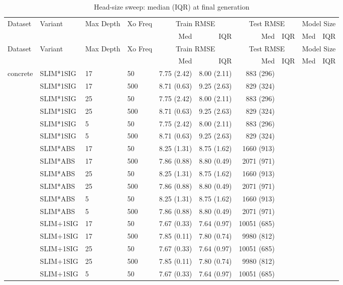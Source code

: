 \begin{longtable}{llllrrrrrr}
\caption{Head-size sweep: median (IQR) at final generation} \label{tab:head_size} \\
\toprule
Dataset & Variant & Max Depth & Xo Freq & \multicolumn{2}{c}{Train RMSE} & \multicolumn{2}{c}{Test RMSE} & \multicolumn{2}{c}{Model Size} \\
\cmidrule(lr){5-6}\cmidrule(lr){7-8}\cmidrule(lr){9-10}
 & &  &  & Med & IQR & Med & IQR & Med & IQR \\
\midrule
\endfirsthead
\toprule
Dataset & Variant & Max Depth & Xo Freq & \multicolumn{2}{c}{Train RMSE} & \multicolumn{2}{c}{Test RMSE} & \multicolumn{2}{c}{Model Size} \\
 & &  &  & Med & IQR & Med & IQR & Med & IQR \\
\midrule
\endhead
\bottomrule
\endfoot
concrete & SLIM*1SIG & 17 & 50 & 7.75 (2.42) & 8.00 (2.11) & 883 (296) \\
 & SLIM*1SIG & 17 & 500 & 8.71 (0.63) & 9.25 (2.63) & 829 (324) \\
 & SLIM*1SIG & 25 & 50 & 7.75 (2.42) & 8.00 (2.11) & 883 (296) \\
 & SLIM*1SIG & 25 & 500 & 8.71 (0.63) & 9.25 (2.63) & 829 (324) \\
 & SLIM*1SIG & 5 & 50 & 7.75 (2.42) & 8.00 (2.11) & 883 (296) \\
 & SLIM*1SIG & 5 & 500 & 8.71 (0.63) & 9.25 (2.63) & 829 (324) \\
 & SLIM*ABS & 17 & 50 & 8.25 (1.31) & 8.75 (1.62) & 1660 (913) \\
 & SLIM*ABS & 17 & 500 & 7.86 (0.88) & 8.80 (0.49) & 2071 (971) \\
 & SLIM*ABS & 25 & 50 & 8.25 (1.31) & 8.75 (1.62) & 1660 (913) \\
 & SLIM*ABS & 25 & 500 & 7.86 (0.88) & 8.80 (0.49) & 2071 (971) \\
 & SLIM*ABS & 5 & 50 & 8.25 (1.31) & 8.75 (1.62) & 1660 (913) \\
 & SLIM*ABS & 5 & 500 & 7.86 (0.88) & 8.80 (0.49) & 2071 (971) \\
 & SLIM+1SIG & 17 & 50 & 7.67 (0.33) & 7.64 (0.97) & 10051 (685) \\
 & SLIM+1SIG & 17 & 500 & 7.85 (0.11) & 7.80 (0.74) & 9980 (812) \\
 & SLIM+1SIG & 25 & 50 & 7.67 (0.33) & 7.64 (0.97) & 10051 (685) \\
 & SLIM+1SIG & 25 & 500 & 7.85 (0.11) & 7.80 (0.74) & 9980 (812) \\
 & SLIM+1SIG & 5 & 50 & 7.67 (0.33) & 7.64 (0.97) & 10051 (685) \\

\end{longtable}
